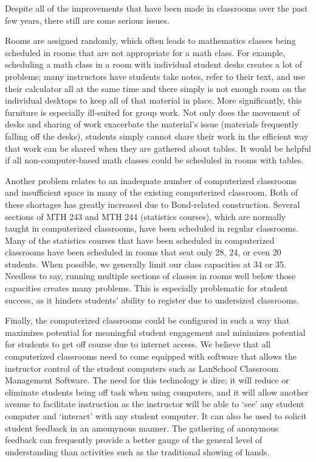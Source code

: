 Despite all of the improvements that have been made in classrooms over the past few years, there still are some serious issues.

Rooms are assigned randomly, which often leads to mathematics classes being scheduled in rooms that are not appropriate for a math class. For example,  scheduling a math class in a room with individual student desks creates a lot of problems; many instructors have students take notes, refer to their text, and use their calculator all at the same time and there simply is not enough room on the individual desktops to keep all of that material in place.  More significantly,  this furniture is especially ill-suited for group work.  Not only does the movement of desks and sharing of work exacerbate the material's issue (materials frequently falling off the desks), students simply cannot share their work in the efficient way that work can be shared when they are gathered about tables.  It would be helpful if all non-computer-based math classes could be scheduled in rooms with tables.

Another problem relates to an inadequate number of computerized classrooms and insufficient space in many of the existing computerized classroom.  Both of these shortages has greatly increased due to Bond-related construction.  Several sections of MTH 243 and MTH 244 (statistics courses), which are normally taught in computerized classrooms, have been scheduled in regular classrooms.  Many of the statistics courses that have been scheduled in computerized classrooms have been scheduled in rooms that seat only 28, 24, or even 20 students.  When possible, we generally limit our class capacities at 34 or 35.  Needless to say, running multiple sections of classes in rooms well below those capacities creates many problems.  This is especially  problematic for student success, as it hinders students'  ability to register due to undersized classrooms.

Finally, the computerized classrooms could be configured in such a way that maximizes potential for meaningful student engagement and minimizes potential for students to get off course due to internet access.  We believe that all computerized classrooms need to come equipped with software that allows the instructor control of the student computers such as LanSchool Classroom Management Software.   The need for this technology is dire; it will reduce or eliminate students being off task when using computers, and it will allow another avenue to facilitate instruction as the instructor will be able to `see' any student computer and `interact' with any student computer.  It can also be used to solicit student feedback in an amomynous manner.  The gathering of anonymous feedback can frequently provide a better gauge of the general level of understanding than activities such as the traditional showing of hands.

